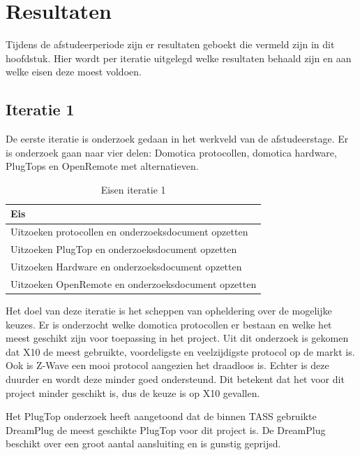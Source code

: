 \documentclass[]{article}
\begin{document}
\newpage
\section{Resultaten}

Tijdens de afstudeerperiode zijn er resultaten geboekt die vermeld zijn in dit
hoofdstuk. Hier wordt per iteratie uitgelegd welke resultaten behaald
zijn en aan welke eisen deze moest voldoen.

\subsection{Iteratie 1}
De eerste iteratie is onderzoek gedaan in het werkveld van de afstudeerstage.
Er is onderzoek gaan naar vier delen: Domotica protocollen, domotica hardware,
PlugTops en OpenRemote met alternatieven. 

\begin{table}[htpb]
  \caption{Eisen iteratie 1}
  \begin{center}
    \begin{tabular}{|| l ||}\hline
        Eis                                                  \\\hline\hline
        Uitzoeken protocollen en onderzoeksdocument opzetten \\\hline
        Uitzoeken PlugTop en onderzoeksdocument opzetten     \\\hline
        Uitzoeken Hardware en onderzoeksdocument opzetten    \\\hline
        Uitzoeken OpenRemote en onderzoeksdocument opzetten  \\\hline
    \end{tabular}
  \end{center}
\end{table}

Het doel van deze iteratie is het scheppen van opheldering over de mogelijke
keuzes. Er is onderzocht welke domotica protocollen er bestaan en welke het
meest geschikt zijn voor toepassing in het project. Uit dit onderzoek is gekomen
dat X10 de meest gebruikte, voordeligste en veelzijdigste protocol op de markt
is. Ook is Z-Wave een mooi protocol aangezien het draadloos is. Echter is deze
duurder en wordt deze minder goed ondersteund. Dit betekent dat het voor dit
project minder geschikt is, dus de keuze is op X10 gevallen.  

Het PlugTop onderzoek heeft aangetoond dat de binnen TASS gebruikte
DreamPlug de meest geschikte PlugTop voor dit project is. De DreamPlug
beschikt over een groot aantal aansluiting en is gunstig geprijsd. 
\end{document}
